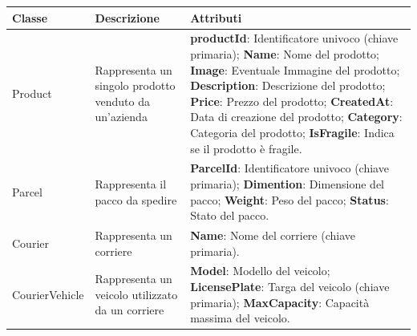 \begin{tabularx}{\textwidth}{YYY}
  \toprule
  \textbf{Classe} & \textbf{Descrizione} & \textbf{Attributi} \\
  \midrule
  Product & Rappresenta un singolo prodotto venduto da un'azienda &
  \begin{minipage}[c]{\linewidth}%
    \vspace{0.5cm}
    \footnotesize
    \textbf{productId}: Identificatore univoco (chiave primaria); \newline
    \textbf{Name}: Nome del prodotto; \newline
    \textbf{Image}: Eventuale Immagine del prodotto; \newline
    \textbf{Description}: Descrizione del prodotto; \newline
    \textbf{Price}: Prezzo del prodotto; \newline
    \textbf{CreatedAt}: Data di creazione del prodotto; \newline
    \textbf{Category}: Categoria del prodotto; \newline
    \textbf{IsFragile}: Indica se il prodotto è fragile. \newline
  \end{minipage} \\
  Parcel & Rappresenta il pacco da spedire &
  \begin{minipage}[c]{\linewidth}%
    \vspace{0.5cm}
    \footnotesize
    \textbf{ParcelId}: Identificatore univoco (chiave primaria); \newline
    \textbf{Dimention}: Dimensione del pacco; \newline
    \textbf{Weight}: Peso del pacco; \newline
    \textbf{Status}: Stato del pacco. \newline
  \end{minipage} \\
  Courier & Rappresenta un corriere &
  \begin{minipage}[c]{\linewidth}%
    \vspace{0.35cm}
    \footnotesize
    \textbf{Name}: Nome del corriere (chiave primaria). \newline
  \end{minipage} \\
  CourierVehicle & \vspace{-0.5cm}Rappresenta un veicolo utilizzato da un corriere &
  \begin{minipage}[c]{\linewidth}%
    \vspace{0.5cm}
    \footnotesize
    \textbf{Model}: Modello del veicolo; \newline
    \textbf{LicensePlate}: Targa del veicolo (chiave primaria); \newline
    \textbf{MaxCapacity}: Capacità massima del veicolo. \newline
  \end{minipage} \\
  \bottomrule
\end{tabularx}

